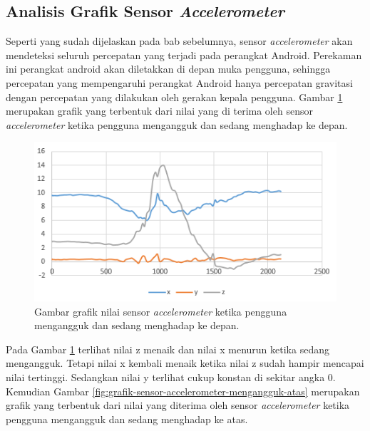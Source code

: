\subsection{Analisis Grafik Sensor \textit{Accelerometer}}
\label{sec:analisis_grafik_sensor_accelerometer}
Seperti yang sudah dijelaskan pada bab sebelumnya, sensor \textit{accelerometer} akan mendeteksi seluruh percepatan yang terjadi pada perangkat Android. Perekaman ini perangkat android akan diletakkan di depan muka pengguna, sehingga percepatan yang mempengaruhi perangkat Android hanya percepatan gravitasi dengan percepatan yang dilakukan oleh gerakan kepala pengguna. Gambar \ref{fig:grafik-sensor-accelerometer-mengangguk-depan} merupakan grafik yang terbentuk dari nilai yang di terima oleh sensor \textit{accelerometer} ketika pengguna mengangguk dan sedang menghadap ke depan.

\begin{figure}[htbp]
\centering
\includegraphics[scale=1]{Gambar/grafik-sensor-accelerometer-mengangguk-depan.png}
\caption{Gambar grafik nilai sensor \textit{accelerometer} ketika pengguna mengangguk dan sedang menghadap ke depan.} 
\label{fig:grafik-sensor-accelerometer-mengangguk-depan}
\end{figure}
Pada Gambar \ref{fig:grafik-sensor-accelerometer-mengangguk-depan} terlihat nilai z menaik dan nilai x menurun ketika sedang mengangguk. Tetapi nilai x kembali menaik ketika nilai z sudah hampir mencapai nilai tertinggi. Sedangkan nilai y terlihat cukup konstan di sekitar angka 0. Kemudian Gambar \ref{fig:grafik-sensor-accelerometer-mengangguk-atas} merupakan grafik yang terbentuk dari nilai yang diterima oleh sensor \textit{accelerometer} ketika pengguna mengangguk dan sedang menghadap ke atas.

